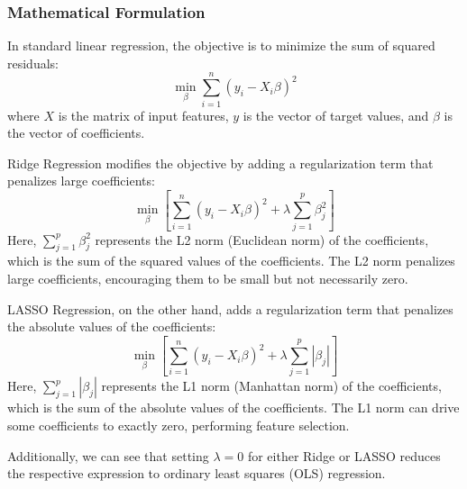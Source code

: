 \documentclass[english,11pt,a4paper,titlepage]{article}
\begin{document}
	\subsubsection*{Mathematical Formulation}
	In standard linear regression, the objective is to minimize the sum of squared residuals:
	\begin{equation*} 
		\min_\beta \sum_{i=1}^{n}(y_i - X_i\beta)^2
	\end{equation*}
	where $X$ is the matrix of input features, $y$ is the vector of target values, and $\beta$ is the vector of coefficients.
	
	Ridge Regression modifies the objective by adding a regularization term that penalizes large coefficients:
	\begin{equation*}
		\min_\beta \left[\sum_{i=1}^{n}(y_i - X_i\beta)^2 + \lambda \sum_{j=1}^{p}\beta_{j}^{2}\right]
	\end{equation*}
	Here, $\sum_{j=1}^{p}\beta_{j}^{2}$ represents the L2 norm (Euclidean norm) of the coefficients, which is the sum of the squared values of the coefficients. The L2 norm penalizes large coefficients, encouraging them to be small but not necessarily zero.
	
	LASSO Regression, on the other hand, adds a regularization term that penalizes the absolute values of the coefficients:
	\begin{equation*}
		\min_\beta \left[\sum_{i=1}^{n}(y_i - X_i\beta)^2 + \lambda \sum_{j=1}^{p}|\beta_{j}|\right]
	\end{equation*}
	Here, $\sum_{j=1}^{p}|\beta_{j}|$ represents the L1 norm (Manhattan norm) of the coefficients, which is the sum of the absolute values of the coefficients. The L1 norm can drive some coefficients to exactly zero, performing feature selection.
	
	Additionally, we can see that setting \( \lambda = 0 \) for either Ridge or LASSO reduces the respective expression to ordinary least squares (OLS) regression.
	
\end{document}
